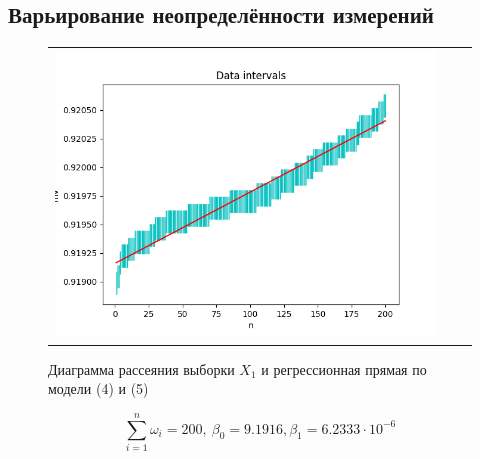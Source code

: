 \documentclass[a4paper,14pt]{article}
\begin{document}
	 \subsection{Варьирование неопределённости измерений}
	\begin{figure}[H]
		\begin{center}
			\begin{tabular}{ccc}
				\includegraphics[scale=0.7]{../image/data_and_intervals2.png}
			\end{tabular}
		\end{center}
		\caption{Диаграмма рассеяния выборки $X_1$ и регрессионная прямая по модели (4) и (5)} 
	\end{figure}
	\begin{equation*}
		\sum\limits_{i=1}^n \omega_i = 200,\ \beta_0 = 9.1916, \beta_1 = 6.2333 \cdot 10^{-6}
	\end{equation*}
\end{document}
